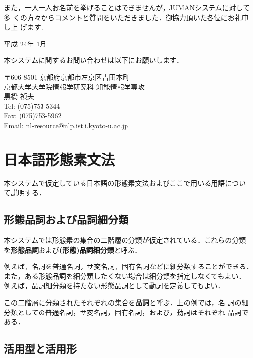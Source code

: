 \documentclass[a4j,titlepage]{jarticle}
\begin{document}
また，一人一人お名前を挙げることはできませんが，JUMANシステムに対して多
くの方々からコメントと質問をいただきました．御協力頂いた各位にお礼申し上
げます．

\begin{flushright}
平成 24年 1月
\end{flushright}

\vfill

\noindent
本システムに関するお問い合わせは以下にお願いします．

\noindent
〒606-8501 京都府京都市左京区吉田本町 \\
京都大学大学院情報学研究科 知能情報学専攻 \\
黒橋 禎夫 \\
Tel: (075)753-5344 \\
Fax: (075)753-5962 \\
Email: {\sf nl-resource@nlp.ist.i.kyoto-u.ac.jp}

\clearpage

\section{日本語形態素文法}\label{s:jmg}

本システムで仮定している日本語の形態素文法およびここで用いる用語につい
て説明する．

\subsection{形態品詞および品詞細分類}
\label{ss:jmg-h}

本システムでは形態素の集合の二階層の分類が仮定されている．これらの分類
を{\bf 形態品詞}および{\bf (形態)品詞細分類}と呼ぶ．

例えば，名詞を普通名詞，サ変名詞，固有名詞などに細分類することができる．
また，ある形態品詞を細分類したくない場合は細分類を指定しなくてもよい．
例えば，品詞細分類を持たない形態品詞として動詞を定義してもよい．

この二階層に分類されたそれぞれの集合を{\bf 品詞}と呼ぶ．上の例では，名
詞の細分類としての普通名詞，サ変名詞，固有名詞，および，動詞はそれぞれ
品詞である．

\subsection{活用型と活用形}
\label{ss:jmg-k}
\end{document}
